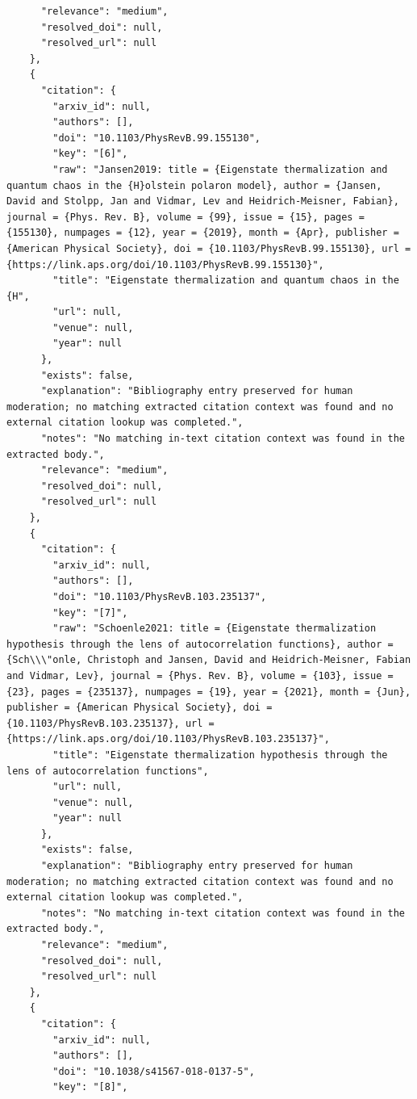 \documentclass[11pt]{article}
\begin{document}
\begin{verbatim}
      "relevance": "medium",
      "resolved_doi": null,
      "resolved_url": null
    },
    {
      "citation": {
        "arxiv_id": null,
        "authors": [],
        "doi": "10.1103/PhysRevB.99.155130",
        "key": "[6]",
        "raw": "Jansen2019: title = {Eigenstate thermalization and quantum chaos in the {H}olstein polaron model}, author = {Jansen, David and Stolpp, Jan and Vidmar, Lev and Heidrich-Meisner, Fabian}, journal = {Phys. Rev. B}, volume = {99}, issue = {15}, pages = {155130}, numpages = {12}, year = {2019}, month = {Apr}, publisher = {American Physical Society}, doi = {10.1103/PhysRevB.99.155130}, url = {https://link.aps.org/doi/10.1103/PhysRevB.99.155130}",
        "title": "Eigenstate thermalization and quantum chaos in the {H",
        "url": null,
        "venue": null,
        "year": null
      },
      "exists": false,
      "explanation": "Bibliography entry preserved for human moderation; no matching extracted citation context was found and no external citation lookup was completed.",
      "notes": "No matching in-text citation context was found in the extracted body.",
      "relevance": "medium",
      "resolved_doi": null,
      "resolved_url": null
    },
    {
      "citation": {
        "arxiv_id": null,
        "authors": [],
        "doi": "10.1103/PhysRevB.103.235137",
        "key": "[7]",
        "raw": "Schoenle2021: title = {Eigenstate thermalization hypothesis through the lens of autocorrelation functions}, author = {Sch\\\"onle, Christoph and Jansen, David and Heidrich-Meisner, Fabian and Vidmar, Lev}, journal = {Phys. Rev. B}, volume = {103}, issue = {23}, pages = {235137}, numpages = {19}, year = {2021}, month = {Jun}, publisher = {American Physical Society}, doi = {10.1103/PhysRevB.103.235137}, url = {https://link.aps.org/doi/10.1103/PhysRevB.103.235137}",
        "title": "Eigenstate thermalization hypothesis through the lens of autocorrelation functions",
        "url": null,
        "venue": null,
        "year": null
      },
      "exists": false,
      "explanation": "Bibliography entry preserved for human moderation; no matching extracted citation context was found and no external citation lookup was completed.",
      "notes": "No matching in-text citation context was found in the extracted body.",
      "relevance": "medium",
      "resolved_doi": null,
      "resolved_url": null
    },
    {
      "citation": {
        "arxiv_id": null,
        "authors": [],
        "doi": "10.1038/s41567-018-0137-5",
        "key": "[8]",

\end{verbatim}
\end{document}
